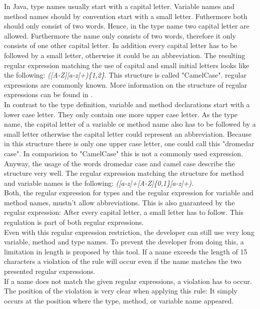 In Java, type names usually start with a capital letter. Variable names and method names should by convention start with a small letter. Futhermore both should only consist of two words. 
Hence, in the type name two capital letter are allowed. Furthermore the name only consists of two words, therefore it only consists of one other capital letter. In addition every capital letter has to be followed by a small letter, otherwise it could be an abbreviation. The resulting regular expression matching the use of capital and small initial letters looks like the following: \textit{([A-Z][a-z]+)\{1,2\}}. This structure is called "CamelCase". regular expressions are commonly known. More information on the structure of regular expressions can be found in \cite[regular expression]{wiki}.
\\

In contrast to the type definition, variable and method declarations start with a lower case letter. They only contain one more upper case letter. As the type name, the capital letter of a variable or method name also has to be followed by a small letter otherwise the capital letter could represent an abbreviation. Because in this structure there is only one upper case letter, one could call this "dromedar case". In comparision to "CamelCase" this is not a commonly used expression. Anyway, the usage of the words dromedar case and camel case describe the structure very well. The regular expression matching the structure for method and variable names is the following: \textit{([a-z]+[A-Z]\{0,1\}[a-z]+)}.
\\

Both, the regular expression for types and the regular expression for variable and method names, mustn't allow abbreviations. This is also guaranteed by the regular expression: After every capital letter, a small letter has to follow. This regulation is part of both regular expressions.
\\


Even with this regular expression restriction, the developer can still use very long variable, method and type names. To prevent the developer from doing this, a limitation in length is proposed by this tool. If a name exceeds the length of 15 characters a violation of the rule will occur even if the name matches the two presented regular expressions.
\\

If a name does not match the given regular expressions, a violation has to occur. The position of the violation is very clear when applying this rule: It simply occurs at the position where the type, method, or variable name appeared. 
\\


